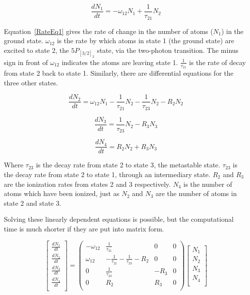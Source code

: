 \documentclass[prb,preprint]{revtex4-1}
\begin{document}
\begin{equation}
\label{RateEq1}
\frac{dN_1}{dt} = -\omega_{12}N_1 + \frac{1}{\tau_{21}}N_2
\end{equation}

Equation~\ref{RateEq1} gives the rate of change in the number of atoms ($N_1$) in the ground state. $\omega_{12}$ is the rate by which atoms in state 1 (the ground state) are excited to state 2, the $5P_{[3/2]_2}$ state, via the two-photon transition. The minus sign in front of $\omega_{12}$ indicates the atoms are leaving state 1. $\frac{1}{\tau_{21}}$ is the rate of decay from state 2 back to state 1. Similarly, there are differential equations for the three other states.

\begin{equation}
\label{RateEq2}
\frac{dN_2}{dt} = \omega_{12}N_1 -  \frac{1}{\tau_{21}}N_2 - \frac{1}{\tau_{23}}N_2 - R_2N_2
\end{equation}

\begin{equation}
\label{RateEq3}
\frac{dN_3}{dt} =  \frac{1}{\tau_{23}}N_2 - R_3N_3
\end{equation}

\begin{equation}
\label{RateEq4}
\frac{dN_4}{dt} = R_2N_2 + R_3N_3
\end{equation}

Where $\tau_{23}$ is the decay rate from state 2 to state 3, the metastable state. $\tau_{23}$ is the decay rate from state 2 to state 1, through an intermediary state. $R_2$ and $R_3$ are the ionization rates from states 2 and 3 respectively. $N_4$ is the number of atoms which have been ionized, just as $N_2$ and $N_3$ are the number of atoms in state 2 and state 3.

Solving these linearly dependent equations is possible, but the computational time is much shorter if they are put into matrix form.

\begin{equation}
\label{RateEqMatrix}
\begin{bmatrix}
	\frac{dN_1}{dt} \\
	\frac{dN_2}{dt} \\
	\frac{dN_3}{dt} \\
	\frac{dN_4}{dt} \\
\end{bmatrix}
=
\begin{pmatrix}
	-\omega_{12} & \frac{1}{\tau_{21}}  & 0 &  0   \\
	\omega_{12}  & -\frac{1}{\tau_{21}}- \frac{1}{\tau_{23}}-R_2 & 0 & 0 \\
	0  &  \frac{1}{\tau_{23}}  & - R_3 & 0 \\
	0  &  R_2  & R_3 & 0  \\
\end{pmatrix}
\begin{bmatrix}
	N_1 \\
	N_2 \\
	N_3 \\
	N_4 \\
\end{bmatrix}
\end{equation}
\end{document}
